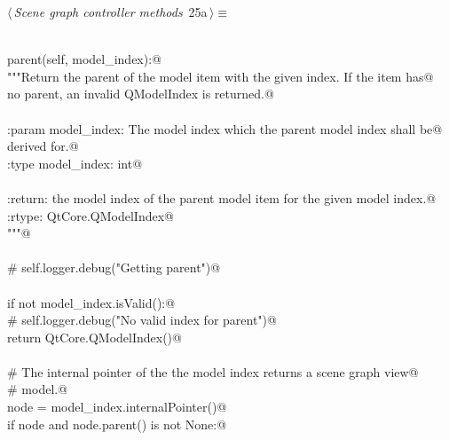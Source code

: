 \documentclass[
    a4paper,      %
    10pt,         %
    openright,    %
    notitlepage,  %
    parskip=half, %
]{scrreprt}       %
\theoremstyle{definition}                    %
\begin{document}
\begin{flushleft} \small
\begin{minipage}{\linewidth}\label{scrap23}\raggedright\small
{} $\langle\,${\itshape Scene graph controller methods}\nobreak\ {\footnotesize {25a}}$\,\rangle\equiv$
\vspace{-1ex}
\begin{list}{}{} \item
\mbox{}\lstinline@@\\
\mbox{}\lstinline@def parent(self, model_index):@\\
\mbox{}\lstinline@    """Return the parent of the model item with the given index. If the item has@\\
\mbox{}\lstinline@    no parent, an invalid QModelIndex is returned.@\\
\mbox{}\lstinline@@\\
\mbox{}\lstinline@    :param model_index: The model index which the parent model index shall be@\\
\mbox{}\lstinline@                        derived for.@\\
\mbox{}\lstinline@    :type model_index: int@\\
\mbox{}\lstinline@@\\
\mbox{}\lstinline@    :return: the model index of the parent model item for the given model index.@\\
\mbox{}\lstinline@    :rtype: QtCore.QModelIndex@\\
\mbox{}\lstinline@    """@\\
\mbox{}\lstinline@@\\
\mbox{}\lstinline@    # self.logger.debug("Getting parent")@\\
\mbox{}\lstinline@@\\
\mbox{}\lstinline@    if not model_index.isValid():@\\
\mbox{}\lstinline@        # self.logger.debug("No valid index for parent")@\\
\mbox{}\lstinline@        return QtCore.QModelIndex()@\\
\mbox{}\lstinline@@\\
\mbox{}\lstinline@    # The internal pointer of the the model index returns a scene graph view@\\
\mbox{}\lstinline@    # model.@\\
\mbox{}\lstinline@    node = model_index.internalPointer()@\\
\mbox{}\lstinline@    if node and node.parent() is not None:@\\

\end{list}
\end{minipage}
\end{flushleft}
\end{document}
